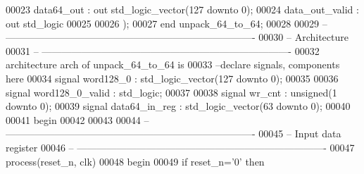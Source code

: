 \begin{DoxyCode}
00023         \textcolor{vhdlchar}{data64_out}      \textcolor{vhdlchar}{:} \textcolor{keywordflow}{out} \textcolor{comment}{std\_logic\_vector}\textcolor{vhdlchar}{(}\textcolor{vhdllogic}{}\textcolor{vhdllogic}{127} \textcolor{keywordflow}{downto} \textcolor{vhdllogic}{}\textcolor{vhdllogic}{0}\textcolor{vhdlchar}{)};
00024         \textcolor{vhdlchar}{data_out_valid}  \textcolor{vhdlchar}{:} \textcolor{keywordflow}{out} \textcolor{comment}{std\_logic}
00025        
00026         \textcolor{vhdlchar}{)};
00027 \textcolor{keywordflow}{end} \textcolor{vhdlchar}{unpack\_64\_to\_64};
00028 
00029 \textcolor{keyword}{-- ----------------------------------------------------------------------------}
00030 \textcolor{keyword}{-- Architecture}
00031 \textcolor{keyword}{-- ----------------------------------------------------------------------------}
00032 \textcolor{keywordflow}{architecture} arch \textcolor{keywordflow}{of} unpack_64_to_64 is
00033 \textcolor{keyword}{--declare signals,  components here}
00034 \textcolor{keywordflow}{signal} \textcolor{vhdlchar}{word128_0}              \textcolor{vhdlchar}{:} \textcolor{comment}{std\_logic\_vector}\textcolor{vhdlchar}{(}\textcolor{vhdllogic}{}\textcolor{vhdllogic}{127} \textcolor{keywordflow}{downto} \textcolor{vhdllogic}{}\textcolor{vhdllogic}{0}\textcolor{vhdlchar}{)};
00035 
00036 \textcolor{keywordflow}{signal} \textcolor{vhdlchar}{word128_0_valid}     \textcolor{vhdlchar}{:} \textcolor{comment}{std\_logic};
00037 
00038 \textcolor{keywordflow}{signal} \textcolor{vhdlchar}{wr_cnt}                 \textcolor{vhdlchar}{:} \textcolor{comment}{unsigned}\textcolor{vhdlchar}{(}\textcolor{vhdllogic}{}\textcolor{vhdllogic}{1} \textcolor{keywordflow}{downto} \textcolor{vhdllogic}{}\textcolor{vhdllogic}{0}\textcolor{vhdlchar}{)};
00039 \textcolor{keywordflow}{signal} \textcolor{vhdlchar}{data64_in_reg}            \textcolor{vhdlchar}{:} \textcolor{comment}{std\_logic\_vector}\textcolor{vhdlchar}{(}\textcolor{vhdllogic}{}\textcolor{vhdllogic}{63} \textcolor{keywordflow}{downto} \textcolor{vhdllogic}{}\textcolor{vhdllogic}{0}\textcolor{vhdlchar}{)};
00040   
00041 \textcolor{vhdlkeyword}{begin}
00042 
00043 
00044 \textcolor{keyword}{-- ----------------------------------------------------------------------------}
00045 \textcolor{keyword}{-- Input data register}
00046 \textcolor{keyword}{-- ----------------------------------------------------------------------------}
00047   \textcolor{keywordflow}{process}(reset_n, clk)
00048 \textcolor{vhdlkeyword}{    begin}
00049       \textcolor{keywordflow}{if} \textcolor{vhdlchar}{reset_n}\textcolor{vhdlchar}{=}\textcolor{vhdlchar}{'}\textcolor{vhdllogic}{}\textcolor{vhdllogic}{0}\textcolor{vhdlchar}{'} \textcolor{keywordflow}{then}

\end{DoxyCode}
